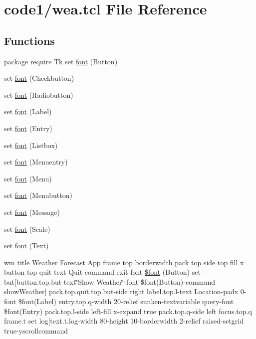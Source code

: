 \hypertarget{wea_8tcl}{
\section{code1/wea.tcl File Reference}
\label{wea_8tcl}
}
\subsection*{Functions}
\begin{DoxyCompactItemize}
\item 
package require Tk set \hyperlink{wea_8tcl_ac58218badd99c82dddeeabfc564e35f3}{font} (Button)
\item 
set \hyperlink{wea_8tcl_a850e3fdd3e4d09562783fadfe266174e}{font} (Checkbutton)
\item 
set \hyperlink{wea_8tcl_aabae97a8710e0ab7a6dd6fd04fc186f6}{font} (Radiobutton)
\item 
set \hyperlink{wea_8tcl_a654cc794f69c21491f98e42981dc6496}{font} (Label)
\item 
set \hyperlink{wea_8tcl_a034354505eb633c882b29ef3920162b7}{font} (Entry)
\item 
set \hyperlink{wea_8tcl_a2518b3906fe6c189f9552e1a1c4ca6de}{font} (Listbox)
\item 
set \hyperlink{wea_8tcl_a02dd664f8d867bf439c7a07893339fc3}{font} (Menuentry)
\item 
set \hyperlink{wea_8tcl_a0f1b795aaa9d990c9a51d59020be7f27}{font} (Menu)
\item 
set \hyperlink{wea_8tcl_a3a486d9f3d8a7fc72fdd05fbe8c4d0e2}{font} (Menubutton)
\item 
set \hyperlink{wea_8tcl_ae0158b91e1ff508297ed2710a5bbe419}{font} (Message)
\item 
set \hyperlink{wea_8tcl_a31794111c1e1a017fb230e7aca9b4b64}{font} (Scale)
\item 
set \hyperlink{wea_8tcl_a17e6a4b259aae039e0012a839ae0f6d6}{font} (Text)
\item 
wm title Weather Forecast App frame top borderwidth pack top side top fill x button top quit text Quit command exit font \hyperlink{wea_8tcl_a31555078de6818c10c61400688cd674d}{\$font} (Button) set but\mbox{[}button.top.but-\/text\char`\"{}Show Weather\char`\"{}-\/font \$font(Button)-\/command showWeather\mbox{]} pack.top.quit.top.but-\/side right label.top.l-\/text Location-\/padx 0-\/font \$font(Label) entry.top.q-\/width 20-\/relief sunken-\/textvariable query-\/font \$font(Entry) pack.top.l-\/side left-\/fill x-\/expand true pack.top.q-\/side left focus.top.q frame.t set log\mbox{[}text.t.log-\/width 80-\/height 10-\/borderwidth 2-\/relief raised-\/setgrid true-\/yscrollcommand
\end{DoxyCompactItemize}


